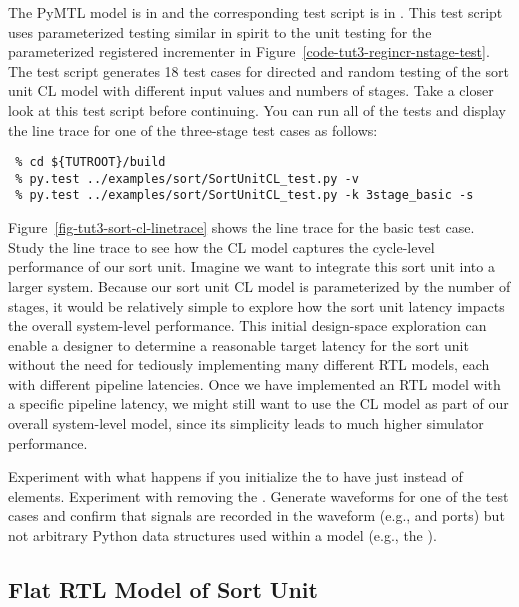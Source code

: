 \documentclass{cbxdoc}
\begin{document}
The PyMTL model is in  and the corresponding test
script is in . This test script uses parameterized
testing similar in spirit to the unit testing for the parameterized
registered incrementer in Figure~\ref{code-tut3-regincr-nstage-test}. The
test script generates 18 test cases for directed and random testing of
the sort unit CL model with different input values and numbers of stages.
Take a closer look at this test script before continuing. You can run all
of the tests and display the line trace for one of the three-stage test
cases as follows:

\begin{verbatim}
 % cd ${TUTROOT}/build
 % py.test ../examples/sort/SortUnitCL_test.py -v
 % py.test ../examples/sort/SortUnitCL_test.py -k 3stage_basic -s
\end{verbatim}



Figure~\ref{fig-tut3-sort-cl-linetrace} shows the line trace for the
basic test case. Study the line trace to see how the CL model captures
the cycle-level performance of our sort unit. Imagine we want to
integrate this sort unit into a larger system. Because our sort unit CL
model is parameterized by the number of stages, it would be relatively
simple to explore how the sort unit latency impacts the overall
system-level performance. This initial design-space exploration can
enable a designer to determine a reasonable target latency for the sort
unit without the need for tediously implementing many different RTL
models, each with different pipeline latencies. Once we have implemented
an RTL model with a specific pipeline latency, we might still want to use
the CL model as part of our overall system-level model, since its
simplicity leads to much higher simulator performance.

\newpage

\vspace*{-0.25in}
\begin{task}
  Experiment with what happens if you initialize the  to have
  just  instead of  elements. Experiment with
  removing the . Generate waveforms for one of the test
  cases and confirm that signals are recorded in the waveform (e.g.,
   and  ports) but not arbitrary Python data structures
  used within a model (e.g., the ).
\end{task}

\subsection{Flat RTL Model of Sort Unit}
\end{document}
